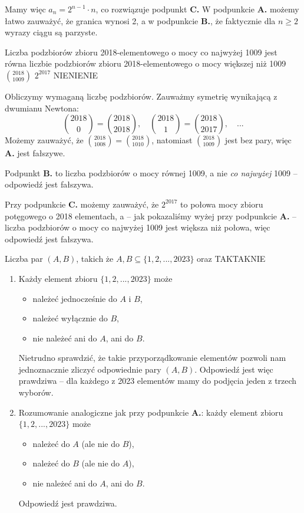 \begin{solutions}
    Mamy więc $a_n = 2^{n-1} \cdot n$, co rozwiązuje podpunkt \textbf{C.} W podpunkcie \textbf{A.} możemy łatwo zauważyć, że granica wynosi 2, a w podpunkcie \textbf{B.}, że faktycznie dla $n \geq 2$ wyrazy ciągu są parzyste.

    \sol Liczba podzbiorów zbioru 2018-elementowego o mocy co najwyżej 1009 jest równa
    \answerss
    {liczbie podzbiorów zbioru 2018-elementowego o mocy większej niż 1009}
    {$\binom{2018}{1009}$}
    {$2^{2017}$}
    {NIE}{NIE}{NIE}
    
    Obliczymy wymaganą liczbę podzbiorów. Zauważmy symetrię wynikającą z dwumianu Newtona: $$\binom{2018}{0} = \binom{2018}{2018}, \quad \binom{2018}{1} = \binom{2018}{2017}, \quad ...$$ Możemy zauważyć, że $\binom{2018}{1008} = \binom{2018}{1010}$, natomiast $\binom{2018}{1009}$ jest bez pary, więc \textbf{A.} jest fałszywe.
    
    Podpunkt \textbf{B.} to liczba podzbiorów o mocy równej 1009, a nie \textit{co najwyżej} 1009 -- odpowiedź jest fałszywa.
    
    Przy podpunkcie \textbf{C.} możemy zauważyć, że $2^{2017}$ to połowa mocy zbioru potęgowego o 2018 elementach, a -- jak pokazaliśmy wyżej przy podpunkcie \textbf{A.} -- liczba podzbiorów o mocy co najwyżej 1009 jest większa niż połowa, więc odpowiedź jest fałszywa.

    \sol Liczba par $(A, B)$, takich że $A, B \subseteq \{1, 2, ..., 2023\}$ oraz
    {TAK}{TAK}{NIE}

    \begin{enumerate}[\bf A.]
        \item Każdy element zbioru $\{1, 2, ..., 2023\}$ może
        \begin{itemize}
            \item należeć jednocześnie do $A$ i $B$,
            \item należeć wyłącznie do $B$,
            \item nie należeć ani do $A$, ani do $B$.
        \end{itemize}
        Nietrudno sprawdzić, że takie przyporządkowanie elementów pozwoli nam jednoznacznie zliczyć odpowiednie pary $(A, B)$. Odpowiedź jest więc prawdziwa -- dla każdego z 2023 elementów mamy do podjęcia jeden z trzech wyborów.

        \item Rozumowanie analogiczne jak przy podpunkcie \textbf{A.}: każdy element zbioru $\{1, 2, ..., 2023\}$ może
        \begin{itemize}
            \item należeć do $A$ (ale nie do $B$),
            \item należeć do $B$ (ale nie do $A$),
            \item nie należeć ani do $A$, ani do $B$.
        \end{itemize}
        Odpowiedź jest prawdziwa.


\end{enumerate}
\end{solutions}
